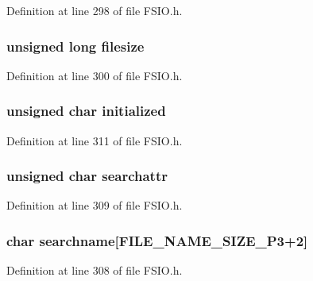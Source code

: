 Definition at line 298 of file F\+S\+I\+O.\+h.

\hypertarget{struct_search_rec_a4c1b7deef43839b86d8a5616ee5428f0}{}
\subsubsection[{filesize}]{\setlength{\rightskip}{0pt plus 5cm}unsigned long filesize}\label{struct_search_rec_a4c1b7deef43839b86d8a5616ee5428f0}


Definition at line 300 of file F\+S\+I\+O.\+h.

\hypertarget{struct_search_rec_ac1e2012077affd3af36e62437d68fa8b}{}
\subsubsection[{initialized}]{\setlength{\rightskip}{0pt plus 5cm}unsigned char initialized}\label{struct_search_rec_ac1e2012077affd3af36e62437d68fa8b}


Definition at line 311 of file F\+S\+I\+O.\+h.

\hypertarget{struct_search_rec_a399bc05b4953e50a5e787f3df4712ac0}{}
\subsubsection[{searchattr}]{\setlength{\rightskip}{0pt plus 5cm}unsigned char searchattr}\label{struct_search_rec_a399bc05b4953e50a5e787f3df4712ac0}


Definition at line 309 of file F\+S\+I\+O.\+h.

\hypertarget{struct_search_rec_a28187bee5f714a63792bc50d7ff52366}{}
\subsubsection[{searchname}]{\setlength{\rightskip}{0pt plus 5cm}char searchname\mbox{[}{\bf F\+I\+L\+E\+\_\+\+N\+A\+M\+E\+\_\+\+S\+I\+Z\+E\+\_\+P3}+2\mbox{]}}\label{struct_search_rec_a28187bee5f714a63792bc50d7ff52366}


Definition at line 308 of file F\+S\+I\+O.\+h.

